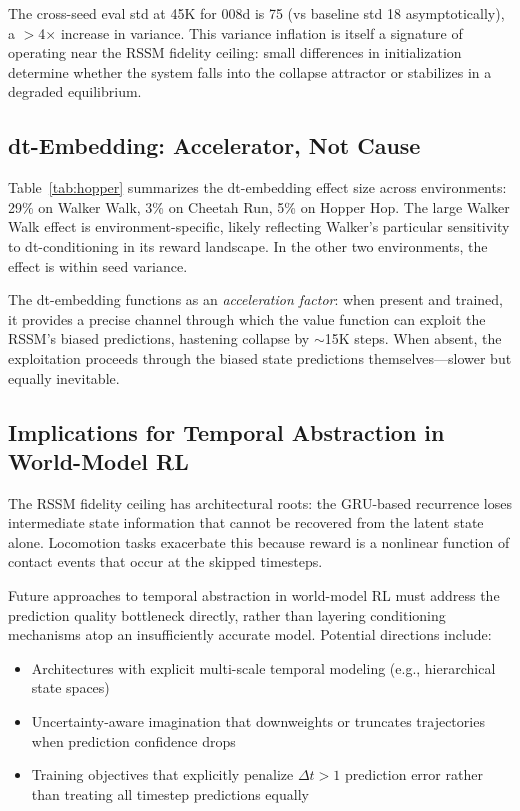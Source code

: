 \documentclass[10pt,letterpaper]{article}
\newcommand{\dt}{\Delta t}
\begin{document}
The cross-seed eval std at 45K for 008d is 75 (vs baseline std 18 asymptotically), a $>$4$\times$ increase in variance.
This variance inflation is itself a signature of operating near the RSSM fidelity ceiling: small differences in initialization determine whether the system falls into the collapse attractor or stabilizes in a degraded equilibrium.

\subsection{dt-Embedding: Accelerator, Not Cause}

Table~\ref{tab:hopper} summarizes the dt-embedding effect size across environments: 29\% on Walker Walk, 3\% on Cheetah Run, 5\% on Hopper Hop.
The large Walker Walk effect is environment-specific, likely reflecting Walker's particular sensitivity to dt-conditioning in its reward landscape.
In the other two environments, the effect is within seed variance.

The dt-embedding functions as an \emph{acceleration factor}: when present and trained, it provides a precise channel through which the value function can exploit the RSSM's biased predictions, hastening collapse by $\sim$15K steps.
When absent, the exploitation proceeds through the biased state predictions themselves---slower but equally inevitable.

\subsection{Implications for Temporal Abstraction in World-Model RL}

The RSSM fidelity ceiling has architectural roots: the GRU-based recurrence loses intermediate state information that cannot be recovered from the latent state alone.
Locomotion tasks exacerbate this because reward is a nonlinear function of contact events that occur at the skipped timesteps.

Future approaches to temporal abstraction in world-model RL must address the prediction quality bottleneck directly, rather than layering conditioning mechanisms atop an insufficiently accurate model.
Potential directions include:
\begin{itemize}[nosep]
  \item Architectures with explicit multi-scale temporal modeling (e.g., hierarchical state spaces)
  \item Uncertainty-aware imagination that downweights or truncates trajectories when prediction confidence drops
  \item Training objectives that explicitly penalize $\dt>1$ prediction error rather than treating all timestep predictions equally
\end{itemize}
\end{document}
